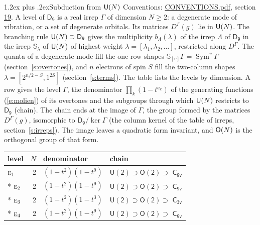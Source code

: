 \documentclass[10pt,a4paper]{article}
\makeatletter
\renewcommand\section{\@startsection{section}{1}{\z@}{-3ex plus -1ex minus -.2ex}%
  {1.2ex plus .2ex}{\normalfont\large\sffamily\bfseries\color{parttitle}}}
\numberwithin{equation}{section}
\newcommand{\grp}[1]{\mathsf{#1}}
\newcommand{\irr}[1]{\text{\normalfont\scshape #1}}
\newcommand{\repD}[1]{D^{#1}}
\newcommand{\schur}[1]{\mathbb{S}_{#1}}
\newcommand{\shape}[1]{[#1]}
\makeatother
\begin{document}
\section{Subduction from \texorpdfstring{$\grp{U(\mathnormal{N})}$}{U(N)}}\label{s:unitary}
Conventions: \href{../../CONVENTIONS.pdf}{CONVENTIONS.pdf}, section \href{../../CONVENTIONS.pdf\#conv.19}{19}.
\leavevmode\label{n:local.level.dimension}A level of $\grp{D_{9}}$ is a real irrep $\Gamma$ of dimension $N \ge 2$: a degenerate mode of vibration, or a set of degenerate orbitals. \label{n:group.unitary}Its matrices $\repD{\Gamma}(g)$ lie in $\grp{U(\mathnormal{N})}$. \label{n:irrep.schur}\label{n:shape.partition}\label{n:local.partition}\label{n:function.multiplicity.unitary}The branching rule $\grp{U(\mathnormal{N})} \supset \grp{D_{9}}$ gives the multiplicity $b_\Lambda(\lambda)$ of the irrep $\Lambda$ of $\grp{D_{9}}$ in the irrep $\schur{\lambda}$ of $\grp{U(\mathnormal{N})}$ of highest weight $\lambda = \shape{\lambda_1, \lambda_2, \dots}$, restricted along $\repD{\Gamma}$. \label{n:local.partition.power}\label{n:local.electrons}\label{n:local.spin}The quanta of a degenerate mode fill the one-row shapes $\schur{\shape{v}}\Gamma = \operatorname{Sym}^{v}\Gamma$ (section~\ref{s:overtones}), and $n$ electrons of spin $S$ fill the two-column shapes $\lambda = \shape{2^{n/2-S}, 1^{2S}}$ (section~\ref{s:terms}).
The table lists the levels by dimension. \label{n:head.level}\label{n:head.denominator}\label{n:index.overtone.denominator}\label{n:head.chain}A row gives the level $\Gamma$, the denominator $\prod_k (1 - t^{a_k})$ of the generating functions (\ref{e:molien}) of its overtones and the subgroups through which $\grp{U(\mathnormal{N})}$ restricts to $\grp{D_{9}}$ (chain). The chain ends at the image of $\Gamma$, the group formed by the matrices $\repD{\Gamma}(g)$, isomorphic to $\grp{D_{9}}/\ker\Gamma$ (the column kernel of the table of irreps, section~\ref{s:irreps}). The image leaves a quadratic form invariant, and $\grp{O(\mathnormal{N})}$ is the orthogonal group of that form.
{\small\begin{longtable}{@{}lrll@{}}\toprule
level & $N$ & denominator & chain\\\midrule\endhead
\bottomrule\endfoot\endlastfoot
$\irr{e}_{1}$ & 2 & $(1-t^{2})(1-t^{9})$ & $\grp{U(2)} \supset \grp{O(2)} \supset$ \href{C9v.pdf}{$\grp{C_{9v}}$}\\*
$\irr{e}_{2}$ & 2 & $(1-t^{2})(1-t^{9})$ & $\grp{U(2)} \supset \grp{O(2)} \supset$ \href{C9v.pdf}{$\grp{C_{9v}}$}\\*
$\irr{e}_{3}$ & 2 & $(1-t^{2})(1-t^{3})$ & $\grp{U(2)} \supset \grp{O(2)} \supset$ \href{C3v.pdf}{$\grp{C_{3v}}$}\\*
$\irr{e}_{4}$ & 2 & $(1-t^{2})(1-t^{9})$ & $\grp{U(2)} \supset \grp{O(2)} \supset$ \href{C9v.pdf}{$\grp{C_{9v}}$}\\
\bottomrule\end{longtable}}
\end{document}
